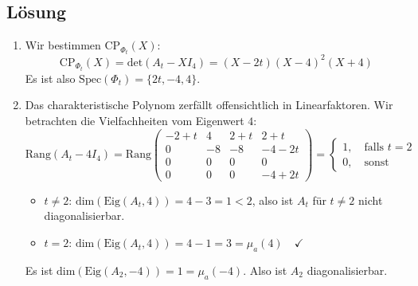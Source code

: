 \subsection{Lösung}
\begin{enumerate}
	\item Wir bestimmen \( \text{CP}_{\Phi_t}(X) \):
	\begin{equation*}
	 	\text{CP}_{\Phi_t}(X) = \text{det}(A_t - XI_4) = (X - 2t)(X - 4)^2(X+4)
	 \end{equation*} 
	 Es ist also \( \text{Spec}(\Phi_t) = \{ 2t, -4, 4 \} \).

	 \item Das charakteristische Polynom zerfällt offensichtlich in Linearfaktoren. Wir betrachten die Vielfachheiten vom Eigenwert \( 4 \): 
	 \begin{equation*}
	 	\text{Rang}(A_t - 4I_4) = \text{Rang}\begin{pmatrix}
	 		-2+t & 4 & 2+t & 2+t \\
	 		0 & -8 & -8 & -4-2t \\
	 		0 & 0 & 0 & 0 \\
	 		0 & 0 & 0 & -4+2t
	 	\end{pmatrix} = \begin{cases}
	 		1, \quad \text{falls } t = 2 \\
	 		0, \quad \text{sonst}
	 	\end{cases}
	 \end{equation*}
	 \begin{itemize}
	 	\item \( t \neq 2 \): \( \text{dim}(\text{Eig}(A_t, 4)) = 4 - 3 = 1 < 2 \), also ist \( A_t \) für \( t \neq 2 \) nicht diagonalisierbar.
	 	\item \( t = 2 \): \( \text{dim}(\text{Eig}(A_t, 4)) = 4 - 1 = 3 = \mu_a(4) \quad \checkmark \)  
	 \end{itemize}
	 Es ist \( \text{dim}(\text{Eig}(A_2, -4)) = 1 = \mu_a(-4) \). Also ist \( A_2 \) diagonalisierbar.


\end{enumerate}

